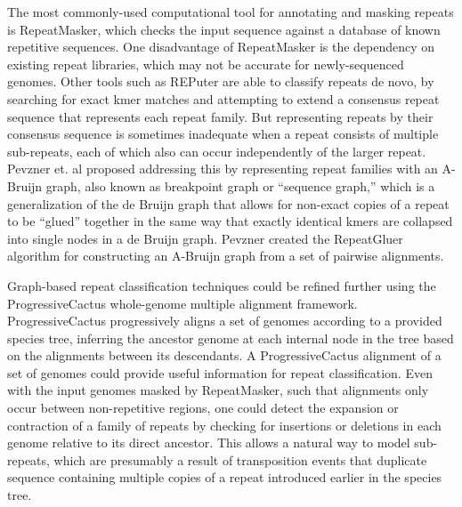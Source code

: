 \documentclass{article}
\begin{document}
The most commonly-used computational tool for annotating and masking repeats is RepeatMasker, which checks the input sequence against a database of known repetitive sequences. One disadvantage of RepeatMasker is the dependency on existing repeat libraries, which may not be accurate for newly-sequenced genomes. Other tools such as REPuter are able to classify repeats de novo, by searching for exact kmer matches and attempting to extend a consensus repeat sequence that represents each repeat family. But representing repeats by their consensus sequence is sometimes inadequate when a repeat consists of multiple sub-repeats, each of which also can occur independently of the larger repeat. Pevzner et. al proposed addressing this by representing repeat families with an A-Bruijn graph, also known as breakpoint graph or “sequence graph,” which is a generalization of the de Bruijn graph that allows for non-exact copies of a repeat to be “glued” together in the same way that exactly identical kmers are collapsed into single nodes in a de Bruijn graph. Pevzner created the RepeatGluer algorithm for constructing an A-Bruijn graph from a set of pairwise alignments. \cite{pevzner_novo_2004}


Graph-based repeat classification techniques could be refined further using the ProgressiveCactus whole-genome multiple alignment framework. ProgressiveCactus progressively aligns a set of genomes according to a provided species tree, inferring the ancestor genome at each internal node in the tree based on the alignments between its descendants. A ProgressiveCactus alignment of a set of genomes could provide useful information for repeat classification. Even with the input genomes masked by RepeatMasker, such that alignments only occur between non-repetitive regions, one could detect the expansion or contraction of a family of repeats by checking for insertions or deletions in each genome relative to its direct ancestor. This allows a natural way to model sub-repeats, which are presumably a result of transposition events that duplicate sequence containing multiple copies of a repeat introduced earlier in the species tree. \cite{hickey_hal:_2013}
\end{document}
